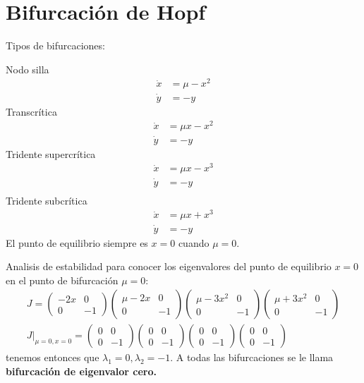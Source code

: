 
\section{Bifurcación de Hopf} 

\begin{tcolorbox}[colback=Black!5, colframe=White, arc=2mm]
\begin{recordatorio}Tipos de bifurcaciones:
	
	Nodo silla
	\begin{align*}
	  \dot{x}&= \mu-x^2 \\
	  \dot{y} &= -y 
	\end{align*}
	Transcrítica
	\begin{align*}
	  \dot{x} &= \mu x -x^2 \\
	  \dot{y} &= -y 
	\end{align*}
	Tridente supercrítica
	\begin{align*}
		\dot{x}&=\mu x - x^3 \\ 
		\dot{y} &= -y \\ 
	\end{align*}
	Tridente subcrítica
	\begin{align*}
	  \dot{x} &= \mu x + x^3 \\
	  \dot{y} &= -y
	\end{align*}
	El punto de equilibrio siempre es $x=0$ cuando  $ \mu=0$.

	Analisis de estabilidad para conocer los eigenvalores del punto de equilibrio $x=0$ en el punto de bifurcación $ \mu=0$:
	\begin{gather*}
		J = \begin{pmatrix} -2x & 0 \\ 0 & -1 \end{pmatrix}  \begin{pmatrix} \mu - 2x & 0 \\ 0 & -1 \end{pmatrix}  \begin{pmatrix} \mu-3x^2 & 0 \\ 0 & -1  \end{pmatrix}  \begin{pmatrix} \mu+3x^2 &  0 \\ 0 & -1 \end{pmatrix} \\ 
		\left. J \right|_{\mu=0 , x = 0} = \begin{pmatrix} 0 & 0 \\ 0 & -1 \end{pmatrix}  \begin{pmatrix} 0 & 0 \\ 0 & -1 \end{pmatrix}  \begin{pmatrix} 0 & 0 \\ 0 & -1 \end{pmatrix}  \begin{pmatrix} 0 & 0 \\ 0 & -1 \end{pmatrix}  
	\end{gather*}
	tenemos entonces que $\lambda_1 = 0, \lambda_2=-1$. 
	A todas las bifurcaciones se le llama \textbf{bifurcación de eigenvalor cero.}
\end{recordatorio}
\end{tcolorbox}
